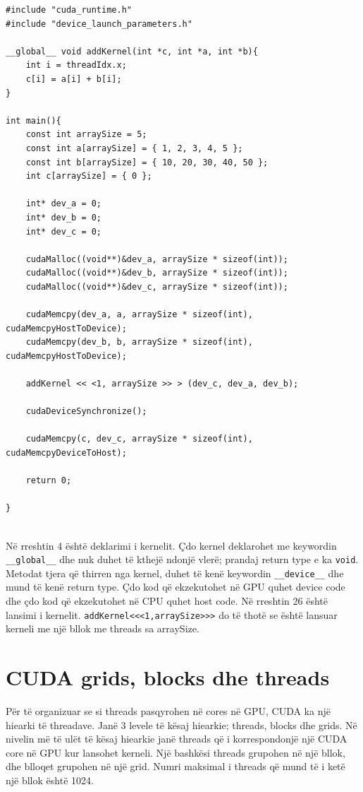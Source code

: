 \begin{lstlisting}
#include "cuda_runtime.h"
#include "device_launch_parameters.h"

__global__ void addKernel(int *c, int *a, int *b){
    int i = threadIdx.x;
    c[i] = a[i] + b[i];
}

int main(){
    const int arraySize = 5;
    const int a[arraySize] = { 1, 2, 3, 4, 5 };
    const int b[arraySize] = { 10, 20, 30, 40, 50 };
    int c[arraySize] = { 0 };
    
    int* dev_a = 0;
    int* dev_b = 0;
    int* dev_c = 0;
    
    cudaMalloc((void**)&dev_a, arraySize * sizeof(int));
    cudaMalloc((void**)&dev_b, arraySize * sizeof(int));
    cudaMalloc((void**)&dev_c, arraySize * sizeof(int));
    
    cudaMemcpy(dev_a, a, arraySize * sizeof(int), cudaMemcpyHostToDevice);
    cudaMemcpy(dev_b, b, arraySize * sizeof(int), cudaMemcpyHostToDevice);
    
    addKernel << <1, arraySize >> > (dev_c, dev_a, dev_b);
    
    cudaDeviceSynchronize();
    
    cudaMemcpy(c, dev_c, arraySize * sizeof(int), cudaMemcpyDeviceToHost);

    return 0;

}
\end{lstlisting}

\noindent \\Në rreshtin 4 është deklarimi i kernelit. Çdo kernel deklarohet me keywordin \texttt{\_\_global\_\_} dhe nuk duhet të kthejë ndonjë vlerë; prandaj return type e ka \texttt {void}. Metodat tjera që thirren nga kernel, duhet të kenë keywordin \texttt{\_\_device\_\_} dhe mund të kenë return type. Çdo kod që ekzekutohet në GPU quhet device code dhe çdo kod që ekzekutohet në CPU quhet host code.  Në rreshtin 26 është lansimi i kernelit. \texttt{addKernel<<<1,arraySize>>>}  do të thotë se është lansuar kerneli me një bllok me threads sa arraySize. 

\section{CUDA grids, blocks dhe threads}

\noindent Për të organizuar se si threads pasqyrohen në cores në GPU, CUDA ka një hiearki të threadave. Janë 3 levele të kësaj hiearkie; threads, blocks dhe grids. Në nivelin më të ulët të kësaj hiearkie janë threads që i korrespondonjë një CUDA core në GPU kur lansohet kerneli. Një bashkësi threads grupohen në një bllok, dhe blloqet grupohen në një grid. Numri maksimal i threads që mund të i ketë një bllok është 1024.

